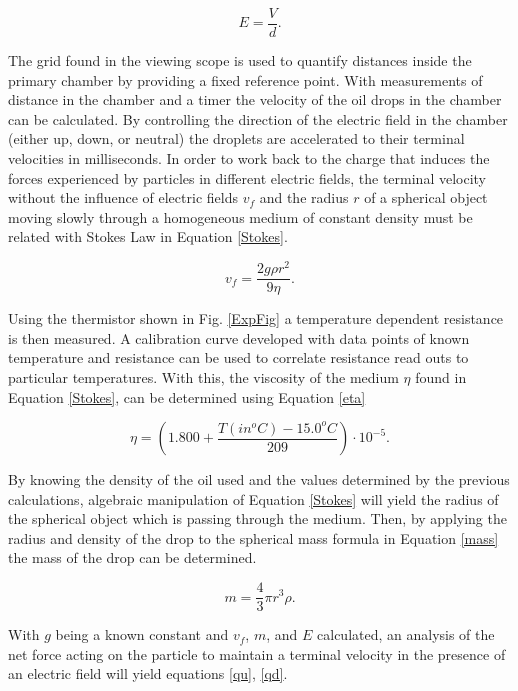 \documentclass[prb,preprint]{revtex4-1}
\begin{document}
\begin{equation}\label{Efield}
E = \frac{V}d.
\end{equation}

The grid found in the viewing scope is used to quantify distances inside the primary chamber by providing a fixed reference point. With measurements of distance in the chamber and a timer the velocity of the oil drops in the chamber can be calculated. By controlling the direction of the electric field in the chamber (either up, down, or neutral) the droplets are accelerated to their terminal velocities in milliseconds. In order to work back to the charge that induces the forces experienced by particles in different electric fields, the terminal velocity without the influence of electric fields $v_f$ and the radius $r$ of a spherical object moving slowly through a homogeneous medium of constant density must be related with Stokes Law in Equation \eqref{Stokes}.

\begin{equation}
\label{Stokes}
v_f = \frac{2 g \rho r^2}{9 \eta}.
\end{equation}

Using the thermistor shown in Fig. \ref{ExpFig} a temperature dependent resistance is then measured. A calibration curve developed with data points of known temperature and resistance can be used to correlate resistance read outs to particular temperatures. With this, the viscosity of the medium $\eta$ found in Equation \eqref{Stokes}, can be determined using Equation \eqref{eta}

\begin{equation}\label{eta}
\eta = \left (1.800 + \frac{T(in ^oC) - 15.0 ^oC}{209} \right ) \cdot 10^{-5}.
\end{equation}

By knowing the density of the oil used and the values determined by the previous calculations, algebraic manipulation of Equation \eqref{Stokes} will yield the radius of the spherical object  which is passing through the medium. Then, by applying the radius and density of the drop to the spherical mass formula in Equation \eqref{mass} the mass of the drop can be determined.

\begin{equation}\label{mass}
m=\frac{4}{3} \pi r^3 \rho.
\end{equation}

With $g$ being a known constant and $v_f$, $m$, and $E$ calculated, an analysis of the net force acting on the particle to maintain a terminal velocity in the presence of an electric field will yield equations \eqref{qu}, \eqref{qd}.
\end{document}
